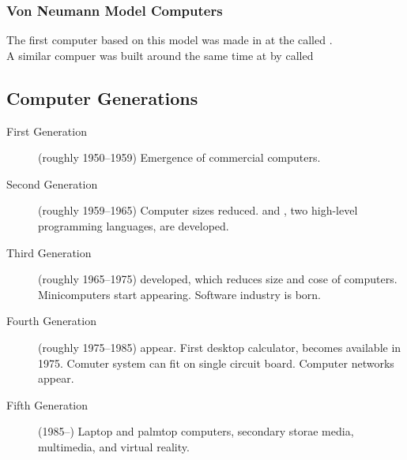 \documentclass[../notes.tex]{subfiles}
\begin{document}
				\subsubsection{Von Neumann Model Computers}
					The first computer based on this model was made in  at the  called .\\
					A similar compuer was built around the same time at  by  called 
			\pagebreak
			\subsection{Computer Generations}
				\begin{description}
					\item[First Generation] (roughly 1950--1959) Emergence of commercial computers.
					\item[Second Generation] (roughly 1959--1965) Computer sizes reduced.  and , two high-level programming languages, are developed.
					\item[Third Generation] (roughly 1965--1975)  developed, which reduces size and cose of computers. Minicomputers start appearing. Software industry is born.
					\item[Fourth Generation] (roughly 1975--1985)  appear. First desktop calculator,  becomes available in 1975. Comuter system can fit on single circuit board. Computer networks appear.
					\item[Fifth Generation] (1985--) Laptop and palmtop computers, secondary storae media, multimedia, and virtual reality.
				\end{description}
\end{document}
